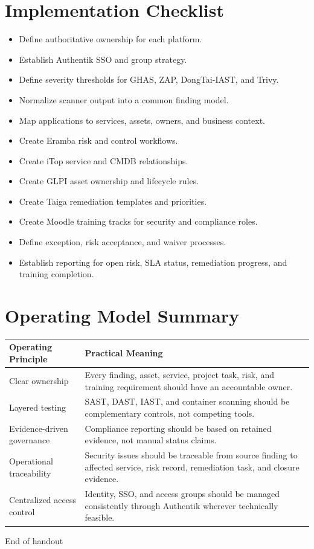 \documentclass[10pt,letterpaper]{article}
\begin{document}
\section{Implementation Checklist}

\begin{multicols}{2}
\begin{itemize}
  \item Define authoritative ownership for each platform.
  \item Establish Authentik SSO and group strategy.
  \item Define severity thresholds for GHAS, ZAP, DongTai-IAST, and Trivy.
  \item Normalize scanner output into a common finding model.
  \item Map applications to services, assets, owners, and business context.
  \item Create Eramba risk and control workflows.
  \item Create iTop service and CMDB relationships.
  \item Create GLPI asset ownership and lifecycle rules.
  \item Create Taiga remediation templates and priorities.
  \item Create Moodle training tracks for security and compliance roles.
  \item Define exception, risk acceptance, and waiver processes.
  \item Establish reporting for open risk, SLA status, remediation progress, and training completion.
\end{itemize}
\end{multicols}

\section{Operating Model Summary}

\begin{tabularx}{\textwidth}{L{1.55in} Y}
\toprule
\textbf{Operating Principle} & \textbf{Practical Meaning} \\
\midrule
Clear ownership & Every finding, asset, service, project task, risk, and training requirement should have an accountable owner. \\
Layered testing & SAST, DAST, IAST, and container scanning should be complementary controls, not competing tools. \\
Evidence-driven governance & Compliance reporting should be based on retained evidence, not manual status claims. \\
Operational traceability & Security issues should be traceable from source finding to affected service, risk record, remediation task, and closure evidence. \\
Centralized access control & Identity, SSO, and access groups should be managed consistently through Authentik wherever technically feasible. \\
\bottomrule
\end{tabularx}

\vfill
\begin{center}
{\small\color{GrayText} End of handout}
\end{center}
\end{document}
